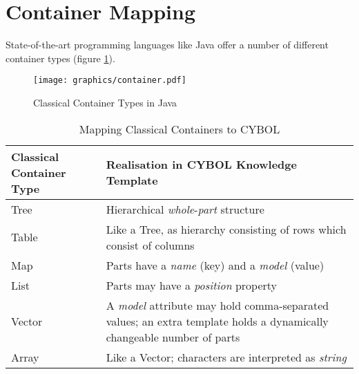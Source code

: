 %
%
%
%
%
%

\section{Container Mapping}
\label{container_mapping_heading}

State-of-the-art programming languages like Java offer a number of different
container types (figure \ref{container_figure}).

\begin{figure}[ht]
    \begin{center}
        \texttt{[image: graphics/container.pdf]}
        \caption{Classical Container Types in Java}
        \label{container_figure}
    \end{center}
\end{figure}

\begin{table}[ht]
    \begin{center}
        \begin{footnotesize}
        \begin{tabular}{| p{35mm} | p{70mm} |}
            \hline
            \textbf{Classical Container Type} & \textbf{Realisation in CYBOL Knowledge Template}\\
            \hline
            Tree & Hierarchical \emph{whole}-\emph{part} structure\\
            \hline
            Table & Like a Tree, as hierarchy consisting of rows which consist of columns\\
            \hline
            Map & Parts have a \emph{name} (key) and a \emph{model} (value)\\
            \hline
            List & Parts may have a \emph{position} property\\
            \hline
            Vector & A \emph{model} attribute may hold comma-separated values;
                an extra template holds a dynamically changeable number of parts\\
            \hline
            Array & Like a Vector; characters are interpreted as \emph{string}\\
            \hline
        \end{tabular}
        \end{footnotesize}
        \caption{Mapping Classical Containers to CYBOL}
        \label{mapping_table}
    \end{center}
\end{table}

